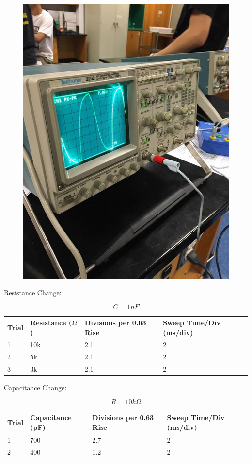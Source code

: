\documentclass[11pt, titlepage]{article}
\begin{document}
\begin{figure}[h]
\centering
\hspace*{0cm}
\includegraphics[scale=0.6]{lab52.jpg}
\vspace*{0cm}
\end{figure}

\underline{Resistance Change:}
\begin{center}
$$C = 1 nF$$
\begin{tabular}
{|m{7em}|m{7em}|m{7em}|m{7em}|}
\hline
Trial & Resistance ($\Omega$) & Divisions per 0.63 Rise & Sweep Time/Div (ms/div)\\
\hline
1 & 10k & 2.1 & 2\\
\hline
2 & 5k & 2.1 & 2\\
\hline
3 & 3k & 2.1 & 2\\
\hline
\end{tabular}
\end{center}

\underline{Capacitance Change:}
\begin{center}
$$R = 10 k\Omega$$
\begin{tabular}
{|m{7em}|m{7em}|m{7em}|m{7em}|}
\hline
Trial & Capacitance (pF) & Divisions per 0.63 Rise & Sweep Time/Div (ms/div)\\
\hline
1 & 700 & 2.7 & 2\\
\hline
2 & 400 & 1.2 & 2\\
\hline
\end{tabular}
\end{center}
\end{document}
